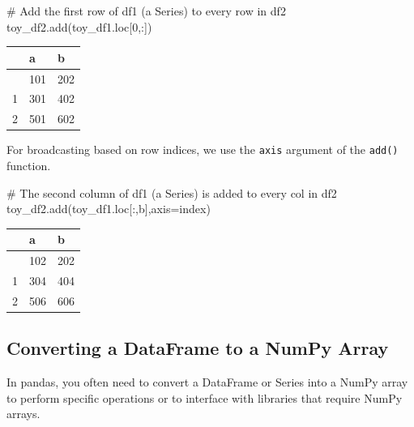 \documentclass[
  letterpaper,
  DIV=11,
  numbers=noendperiod]{scrreprt}
\newenvironment{Shaded}{\begin{snugshade}}{\end{snugshade}}
\newcommand{\CommentTok}[1]{\textcolor[rgb]{0.37,0.37,0.37}{#1}}
\newcommand{\DecValTok}[1]{\textcolor[rgb]{0.68,0.00,0.00}{#1}}
\newcommand{\NormalTok}[1]{\textcolor[rgb]{0.00,0.23,0.31}{#1}}
\newcommand{\OperatorTok}[1]{\textcolor[rgb]{0.37,0.37,0.37}{#1}}
\newcommand{\StringTok}[1]{\textcolor[rgb]{0.13,0.47,0.30}{#1}}
\begin{document}
\begin{Shaded}
\begin{Highlighting}[]
\CommentTok{\# Add the first row of df1 (a Series) to every row in df2 }
\NormalTok{toy\_df2.add(toy\_df1.loc[}\DecValTok{0}\NormalTok{,:])}
\end{Highlighting}
\end{Shaded}

\begin{longtable}[]{@{}lll@{}}
\toprule\noalign{}
& a & b \\
\midrule\noalign{}
\endhead
\bottomrule\noalign{}
\endlastfoot
0 & 101 & 202 \\
1 & 301 & 402 \\
2 & 501 & 602 \\
\end{longtable}

For broadcasting based on row indices, we use the \texttt{axis} argument
of the \texttt{add()} function.

\begin{Shaded}
\begin{Highlighting}[]
\CommentTok{\# The second column of df1 (a Series) is added to every col in df2}
\NormalTok{toy\_df2.add(toy\_df1.loc[:,}\StringTok{\textquotesingle{}b\textquotesingle{}}\NormalTok{],axis}\OperatorTok{=}\StringTok{\textquotesingle{}index\textquotesingle{}}\NormalTok{)}
\end{Highlighting}
\end{Shaded}

\begin{longtable}[]{@{}lll@{}}
\toprule\noalign{}
& a & b \\
\midrule\noalign{}
\endhead
\bottomrule\noalign{}
\endlastfoot
0 & 102 & 202 \\
1 & 304 & 404 \\
2 & 506 & 606 \\
\end{longtable}

\hypertarget{converting-a-dataframe-to-a-numpy-array}{%
\subsection{Converting a DataFrame to a NumPy
Array}\label{converting-a-dataframe-to-a-numpy-array}}

In pandas, you often need to convert a DataFrame or Series into a NumPy
array to perform specific operations or to interface with libraries that
require NumPy arrays.
\end{document}

